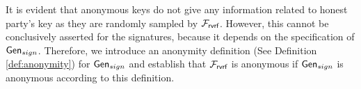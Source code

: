 	It is evident that anonymous keys do not give any information related to honest party's key as they are randomly sampled by $ \mathcal{F}_{\textsf{rvrf}} $. However, this cannot be conclusively asserted for the signatures, because it depends on the specification of $ \mathsf{Gen}_{sign} $. Therefore, we introduce an anonymity definition (See Definition \ref{def:anonymity}) for $ \mathsf{Gen}_{sign} $ and establish that $ \mathcal{F}_{\textsf{rvrf}} $ is anonymous if $ \mathsf{Gen}_{sign} $ is anonymous according to this definition.
	

	
%		
%		
	
